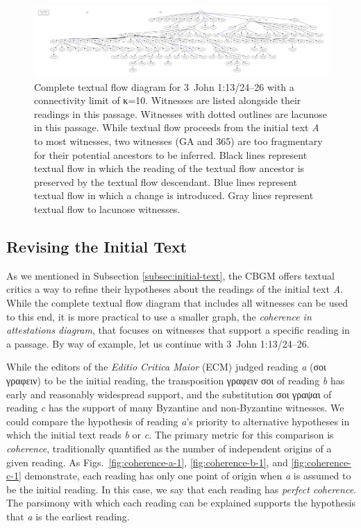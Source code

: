 \documentclass[a4paper, 12pt]{article}
\begin{document}
	\begin{figure}
		\includegraphics[width=\textwidth]{../graphics/B25K1V13U24-26-textual-flow.pdf}
		\caption{Complete textual flow diagram for 3~John 1:13/24–26 with a connectivity limit of κ=10. Witnesses are listed alongside their readings in this passage. Witnesses with dotted outlines are lacunose in this passage. While textual flow proceeds from the initial text \emph{A} to most witnesses, two witnesses (GA  and 365) are too fragmentary for their potential ancestors to be inferred. Black lines represent textual flow in which the reading of the textual flow ancestor is preserved by the textual flow descendant. Blue lines represent textual flow in which a change is introduced. Gray lines represent textual flow to lacunose witnesses.}
		\label{fig:textual-flow}
	\end{figure}
	
	\newpage
	
	\subsection{Revising the Initial Text}\label{subsec:revising-initial-text}
	As we mentioned in Subsection \ref{subsec:initial-text}, the CBGM offers textual critics a way to refine their hypotheses about the readings of the initial text \emph{A}. While the complete textual flow diagram that includes all witnesses can be used to this end, it is more practical to use a smaller graph, the \emph{coherence in attestations diagram}, that focuses on witnesses that support a specific reading in a passage. By way of example, let us continue with 3~John 1:13/24–26.
	
	While the editors of the \emph{Editio Critica Maior} (ECM) judged reading \emph{a} (σοι γραφειν) to be the initial reading, the transposition γραφειν σοι of reading \emph{b} has early and reasonably widespread support, and the substitution σοι γραψαι of reading \emph{c} has the support of many Byzantine and non-Byzantine witnesses. We could compare the hypothesis of reading \emph{a}'s priority to alternative hypotheses in which the initial text reads \emph{b} or \emph{c}. The primary metric for this comparison is \emph{coherence}, traditionally quantified as the number of independent origins of a given reading. As Figs.~\ref{fig:coherence-a-1}, \ref{fig:coherence-b-1}, and \ref{fig:coherence-c-1} demonstrate, each reading has only one point of origin when \emph{a} is assumed to be the initial reading. In this case, we say that each reading has \emph{perfect coherence}. The parsimony with which each reading can be explained supports the hypothesis that \emph{a} is the earliest reading.
	
\end{document}
